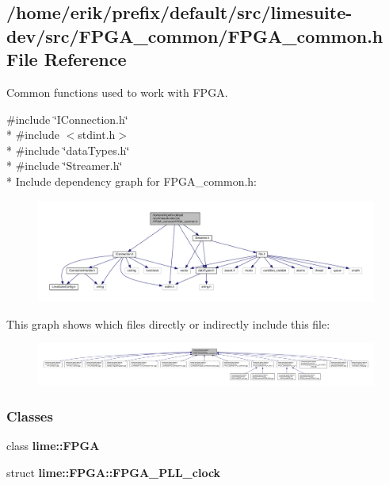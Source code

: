 \subsection{/home/erik/prefix/default/src/limesuite-\/dev/src/\+F\+P\+G\+A\+\_\+common/\+F\+P\+G\+A\+\_\+common.h File Reference}
\label{FPGA__common_8h}


Common functions used to work with F\+P\+GA.  


{\ttfamily \#include \char`\"{}I\+Connection.\+h\char`\"{}}\\*
{\ttfamily \#include $<$stdint.\+h$>$}\\*
{\ttfamily \#include \char`\"{}data\+Types.\+h\char`\"{}}\\*
{\ttfamily \#include \char`\"{}Streamer.\+h\char`\"{}}\\*
Include dependency graph for F\+P\+G\+A\+\_\+common.\+h\+:
\nopagebreak
\begin{figure}[H]
\begin{center}
\leavevmode
\includegraphics[width=350pt]{dc/df5/FPGA__common_8h__incl}
\end{center}
\end{figure}
This graph shows which files directly or indirectly include this file\+:
\nopagebreak
\begin{figure}[H]
\begin{center}
\leavevmode
\includegraphics[width=350pt]{da/dda/FPGA__common_8h__dep__incl}
\end{center}
\end{figure}
\subsubsection*{Classes}
\begin{DoxyCompactItemize}
\item 
class {\bf lime\+::\+F\+P\+GA}
\item 
struct {\bf lime\+::\+F\+P\+G\+A\+::\+F\+P\+G\+A\+\_\+\+P\+L\+L\+\_\+clock}
\end{DoxyCompactItemize}
